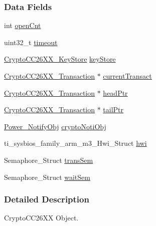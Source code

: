 \subsubsection*{Data Fields}
\begin{DoxyCompactItemize}
\item 
int \hyperlink{struct_crypto_c_c26_x_x___object_aed6ed8c1a1fb38542f0a66bac8b207d1}{open\+Cnt}
\item 
uint32\+\_\+t \hyperlink{struct_crypto_c_c26_x_x___object_a7bf2c514e22988c397d2b49e5a7be53b}{timeout}
\item 
\hyperlink{_crypto_c_c26_x_x_8h_a30e647b6ad6b608b60990929200686e0}{Crypto\+C\+C26\+X\+X\+\_\+\+Key\+Store} \hyperlink{struct_crypto_c_c26_x_x___object_a73d676dd4ff0815b55058c15c6315bb9}{key\+Store}
\item 
\hyperlink{struct_crypto_c_c26_x_x___transaction}{Crypto\+C\+C26\+X\+X\+\_\+\+Transaction} $\ast$ \hyperlink{struct_crypto_c_c26_x_x___object_a6ebc5fa5ae8455db12e9a01b34a75dbf}{current\+Transact}
\item 
\hyperlink{struct_crypto_c_c26_x_x___transaction}{Crypto\+C\+C26\+X\+X\+\_\+\+Transaction} $\ast$ \hyperlink{struct_crypto_c_c26_x_x___object_a6723e9a4eb86f36e8860c5ef541466fc}{head\+Ptr}
\item 
\hyperlink{struct_crypto_c_c26_x_x___transaction}{Crypto\+C\+C26\+X\+X\+\_\+\+Transaction} $\ast$ \hyperlink{struct_crypto_c_c26_x_x___object_a7474f4d229f4f9274dbfa2b0766b52ce}{tail\+Ptr}
\item 
\hyperlink{struct_power___notify_obj}{Power\+\_\+\+Notify\+Obj} \hyperlink{struct_crypto_c_c26_x_x___object_ac6f020255e0552838fa662df76bfdb8e}{crypto\+Noti\+Obj}
\item 
ti\+\_\+sysbios\+\_\+family\+\_\+arm\+\_\+m3\+\_\+\+Hwi\+\_\+\+Struct \hyperlink{struct_crypto_c_c26_x_x___object_ade45a49db795267b21c108926d3a69a2}{hwi}
\item 
Semaphore\+\_\+\+Struct \hyperlink{struct_crypto_c_c26_x_x___object_add5ff652a01c8f755f9ffc6da8ff7781}{trans\+Sem}
\item 
Semaphore\+\_\+\+Struct \hyperlink{struct_crypto_c_c26_x_x___object_a5845db71c0440f667b9ab19e22ee8fd5}{wait\+Sem}
\end{DoxyCompactItemize}


\subsubsection{Detailed Description}
Crypto\+C\+C26\+X\+X Object. 

